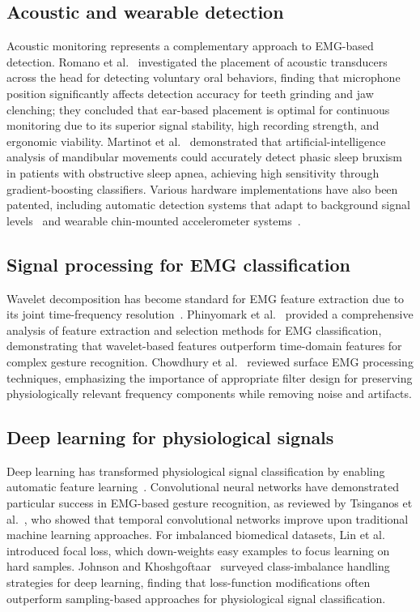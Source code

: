 \documentclass[pdflatex,sn-nature,iicol]{sn-jnl}
\begin{document}
\subsection{Acoustic and wearable detection}

Acoustic monitoring represents a complementary approach to EMG-based detection. Romano et al.~\cite{romano2024wearable} investigated the placement of acoustic transducers across the head for detecting voluntary oral behaviors, finding that microphone position significantly affects detection accuracy for teeth grinding and jaw clenching; they concluded that ear-based placement is optimal for continuous monitoring due to its superior signal stability, high recording strength, and ergonomic viability. Martinot et al.~\cite{martinot2021artificial} demonstrated that artificial-intelligence analysis of mandibular movements could accurately detect phasic sleep bruxism in patients with obstructive sleep apnea, achieving high sensitivity through gradient-boosting classifiers. Various hardware implementations have also been patented, including automatic detection systems that adapt to background signal levels~\cite{haugland2020automatic} and wearable chin-mounted accelerometer systems~\cite{patwa2017bruxism}.

\subsection{Signal processing for EMG classification}

Wavelet decomposition has become standard for EMG feature extraction due to its joint time-frequency resolution~\cite{englehart2003robust}. Phinyomark et al.~\cite{phinyomark2012feature} provided a comprehensive analysis of feature extraction and selection methods for EMG classification, demonstrating that wavelet-based features outperform time-domain features for complex gesture recognition. Chowdhury et al.~\cite{chowdhury2013surface} reviewed surface EMG processing techniques, emphasizing the importance of appropriate filter design for preserving physiologically relevant frequency components while removing noise and artifacts.

\subsection{Deep learning for physiological signals}

Deep learning has transformed physiological signal classification by enabling automatic feature learning~\cite{faust2018deep}. Convolutional neural networks have demonstrated particular success in EMG-based gesture recognition, as reviewed by Tsinganos et al.~\cite{tsinganos2019improved}, who showed that temporal convolutional networks improve upon traditional machine learning approaches. For imbalanced biomedical datasets, Lin et al.~\cite{lin2017focal} introduced focal loss, which down-weights easy examples to focus learning on hard samples. Johnson and Khoshgoftaar~\cite{johnson2019survey} surveyed class-imbalance handling strategies for deep learning, finding that loss-function modifications often outperform sampling-based approaches for physiological signal classification.
\end{document}
